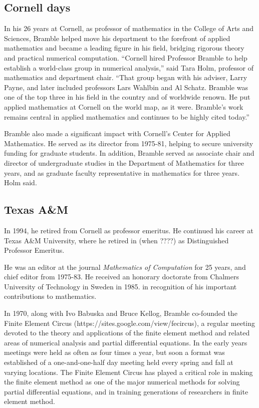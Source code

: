 \documentclass[CJK,11pt]{amsart}
\theoremstyle{definition}
\begin{document}
\begin{CJK*}{UTF8}{gbsn}
\subsection{Cornell days}
In his 26 years at Cornell, as professor of mathematics in the College of Arts and Sciences,  Bramble helped move his department to the forefront of applied mathematics and became a leading figure in his field, bridging rigorous theory and practical numerical computation.  “Cornell hired Professor Bramble to help establish a world-class group in numerical analysis,” said Tara Holm, professor of mathematics and department chair. “That group began with his adviser, Larry Payne, and later included professors Lars Wahlbin and Al Schatz. Bramble was one of the top three in his field in the country and of worldwide renown. He put applied mathematics at Cornell on the world map, as it were. Bramble’s work remains central in applied mathematics and continues to be highly cited today.”

Bramble also made a significant impact with Cornell’s Center for Applied Mathematics. He served as its director from 1975-81, helping to secure university funding for graduate students.  In addition, Bramble served as associate chair and director of undergraduate studies in the Department of Mathematics for three years, and as graduate faculty representative in mathematics for three years.  Holm said.

\subsection{Texas A\&M}
In 1994, he retired from Cornell as professor emeritus. He continued his career at Texas A\&M University, where he retired in (when ????) as Distinguished Professor Emeritus. 

He was an editor at the journal {\it Mathematics of Computation} for 25 years, and chief editor from 1975-83. He received an honorary doctorate from Chalmers University of Technology in Sweden in 1985.  in recognition of his important contributions to mathematics.

In 1970, along with Ivo Babuska and Bruce Kellog, Bramble co-founded the Finite Element Circus (https://sites.google.com/view/fecircus), a regular meeting devoted to the theory and applications of the finite element method and related areas of numerical analysis and partial differential equations.  In the early years meetings were held as often as four times a year, but soon a format was established of a one-and-one-half day meeting held every spring and fall at varying locations.  The Finite Element Circus has played a critical role in making the finite element method as one of the major numerical methods for solving partial differential equations, and in training generations of researchers in finite element method.


\end{CJK*}
\end{document}
